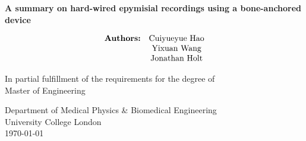 \begin{titlepage}
    \begin{center}
        \vspace*{1cm}
            
        \huge
        \textbf{A summary on hard-wired epymisial recordings using a bone-anchored device}
            
        \vspace{0.5cm}
        \Large
        \vspace{1.5cm} \begin{align*}
            \begin{matrix}
                \text{\textbf{Authors:}} & \text{Cuiyueyue Hao} \\
                                         & \text{Yixuan Wang} \\
                                         & \text{Jonathan Holt} \\
            \end{matrix} \end{align*}

            
        \vfill
            
        In partial fulfillment of the requirements for the degree of \\
        Master of Engineering
            
        \vspace{0.8cm}
            
        \large
        Department of Medical Physics \& Biomedical Engineering\\
        University College London\\
        \today \\
            
    \end{center}
\end{titlepage}